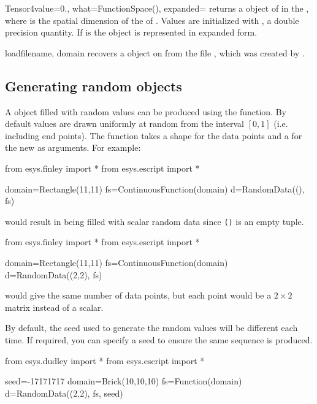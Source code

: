 \begin{funcdesc}{Tensor4}{value=0., what=FunctionSpace(), expanded=\False}
returns a \Data object of \Shape {} in the \FunctionSpace {},
where  is the spatial dimension of the \Domain of .
Values are initialized with , a double precision quantity.
If  is \True the \Data object is represented in expanded form.
\end{funcdesc}

\begin{funcdesc}{load}{filename, domain}
recovers a \Data object on \Domain {} from the file ,
which was created by .
\end{funcdesc}

\subsection{Generating random \Data objects}
A \Data object filled with random values can be produced using the
 function.
By default values are drawn uniformly at random from the interval $[0,1]$ (i.e.
including end points).
The function takes a shape for the data points and a \FunctionSpace for the new
\Data as arguments.
For example:
\begin{python}
from esys.finley import *
from esys.escript import *

domain=Rectangle(11,11)
fs=ContinuousFunction(domain)
d=RandomData((), fs)
\end{python}
would result in  being filled with scalar random data since \texttt{()}
is an empty tuple.

\begin{python}
from esys.finley import *
from esys.escript import *

domain=Rectangle(11,11)
fs=ContinuousFunction(domain)
d=RandomData((2,2), fs)
\end{python}
would give  the same number of data points, but each point would be a
$2\times 2$ matrix instead of a scalar.

By default, the seed used to generate the random values will be different each
time.
If required, you can specify a seed to ensure the same sequence is produced.
\begin{python}
from esys.dudley import *
from esys.escript import *

seed=-17171717
domain=Brick(10,10,10)
fs=Function(domain)
d=RandomData((2,2), fs, seed)
\end{python}


